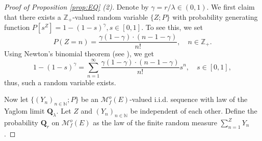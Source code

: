 \documentclass[12pt,a4paper]{amsart}
\numberwithin{equation}{section}
\theoremstyle{plain}
\theoremstyle{definition}
\theoremstyle{remark}
\begin{document}
\begin{proof}[Proof of Proposition \ref{prop:EQ} (2)]
	Denote by $\gamma = r / \lambda \in (0,1)$.
	We first claim that there exists a $\mathbb Z_+$-valued random variable $\{Z;P\}$ with probability generating function $P[s^Z] = 1 - (1- s)^{\gamma}, s\in [0,1]$. 
	To see this, we set
\[
	P(Z = n) = \frac{\gamma(1-\gamma ) \cdot (n-1-\gamma  )}{n!},
	\quad n \in \mathbb Z_+.
\]
	Using Newton's binomial theorem (see \cite[Exercise 8.22]{Rudin1976Principles}), we get
\[
	1 - (1 - s)^\gamma = \sum_{n = 1}^\infty \frac{\gamma (1-\gamma)\cdot (n-1-\gamma )}{n!} s^n, \quad s\in [0,1],
\]
	thus, such a random variable exists.
	
	Now let $\{(Y_n)_{n \in \mathbb N}; P\}$
	be an $\mathcal M^o_f(E)$-valued i.i.d. sequence
	with law of the Yaglom limit $\mathbf Q_\lambda$.
	Let $Z$ and $(Y_n)_{n\in \mathbb N}$ be independent of each other.
	Define the probability $\mathbf Q_r$ on $\mathcal M^o_f(E)$ as the law of the finite random measure $\sum_{n=1}^Z Y_n$.
	

\end{proof}
\end{document}
